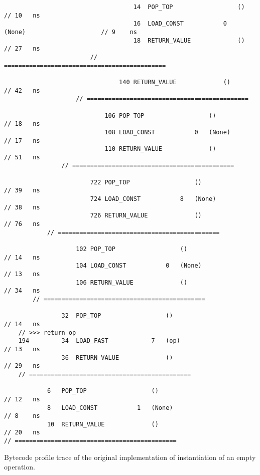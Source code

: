 \begin{code}
\begin{verbatim}
                                    14  POP_TOP                  ()                         // 10   ns
                                    16  LOAD_CONST           0   (None)                     // 9    ns
                                    18  RETURN_VALUE             ()                         // 27   ns
                        // =============================================

                                140 RETURN_VALUE             ()                             // 42   ns
                    // =============================================

                            106 POP_TOP                  ()                                 // 18   ns
                            108 LOAD_CONST           0   (None)                             // 17   ns
                            110 RETURN_VALUE             ()                                 // 51   ns
                // =============================================

                        722 POP_TOP                  ()                                     // 39   ns
                        724 LOAD_CONST           8   (None)                                 // 38   ns
                        726 RETURN_VALUE             ()                                     // 76   ns
            // =============================================

                    102 POP_TOP                  ()                                         // 14   ns
                    104 LOAD_CONST           0   (None)                                     // 13   ns
                    106 RETURN_VALUE             ()                                         // 34   ns
        // =============================================

                32  POP_TOP                  ()                                             // 14   ns
    // >>> return op
    194         34  LOAD_FAST            7   (op)                                           // 13   ns
                36  RETURN_VALUE             ()                                             // 29   ns
    // =============================================

            6   POP_TOP                  ()                                                 // 12   ns
            8   LOAD_CONST           1   (None)                                             // 8    ns
            10  RETURN_VALUE             ()                                                 // 20   ns
// =============================================
    \end{verbatim}
    \caption{Bytecode profile trace of the original implementation of instantiation of an empty operation.}
    \label{listing:bytecode-profiles-op-build-original}
\end{code}

